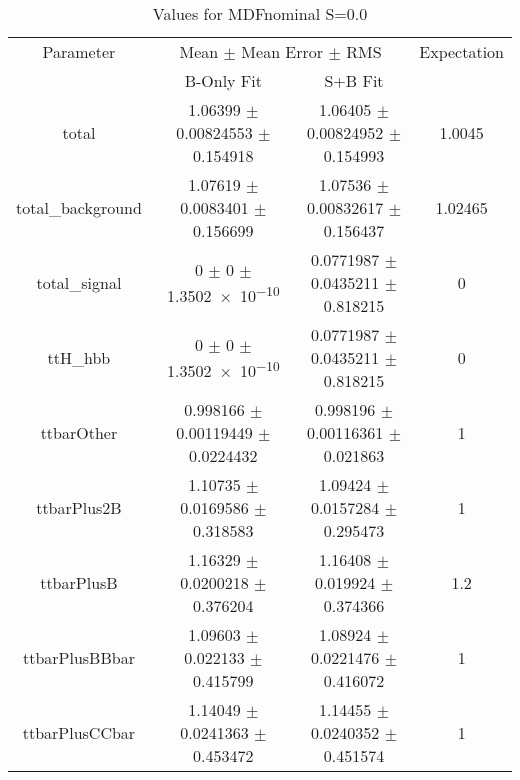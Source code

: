 \begin{table}
\centering
\caption{Values for MDFnominal S=0.0}
\begin{tabular}{cccc}
\toprule
Parameter & \multicolumn{2}{c}{Mean $\pm$ Mean Error $\pm$ RMS} & Expectation\\
 & B-Only Fit & S+B Fit & \\
\midrule
total & \num{1.06399} $\pm$ \num{0.00824553} $\pm$ \num{0.154918} & \num{1.06405} $\pm$ \num{0.00824952} $\pm$ \num{0.154993} & \num{1.0045}\\
total\_background & \num{1.07619} $\pm$ \num{0.0083401} $\pm$ \num{0.156699} & \num{1.07536} $\pm$ \num{0.00832617} $\pm$ \num{0.156437} & \num{1.02465}\\
total\_signal & \num{0} $\pm$ \num{0} $\pm$ \num{1.3502e-10} & \num{0.0771987} $\pm$ \num{0.0435211} $\pm$ \num{0.818215} & \num{0}\\
ttH\_hbb & \num{0} $\pm$ \num{0} $\pm$ \num{1.3502e-10} & \num{0.0771987} $\pm$ \num{0.0435211} $\pm$ \num{0.818215} & \num{0}\\
ttbarOther & \num{0.998166} $\pm$ \num{0.00119449} $\pm$ \num{0.0224432} & \num{0.998196} $\pm$ \num{0.00116361} $\pm$ \num{0.021863} & \num{1}\\
ttbarPlus2B & \num{1.10735} $\pm$ \num{0.0169586} $\pm$ \num{0.318583} & \num{1.09424} $\pm$ \num{0.0157284} $\pm$ \num{0.295473} & \num{1}\\
ttbarPlusB & \num{1.16329} $\pm$ \num{0.0200218} $\pm$ \num{0.376204} & \num{1.16408} $\pm$ \num{0.019924} $\pm$ \num{0.374366} & \num{1.2}\\
ttbarPlusBBbar & \num{1.09603} $\pm$ \num{0.022133} $\pm$ \num{0.415799} & \num{1.08924} $\pm$ \num{0.0221476} $\pm$ \num{0.416072} & \num{1}\\
ttbarPlusCCbar & \num{1.14049} $\pm$ \num{0.0241363} $\pm$ \num{0.453472} & \num{1.14455} $\pm$ \num{0.0240352} $\pm$ \num{0.451574} & \num{1}\\
\bottomrule
\end{tabular}
\end{table}